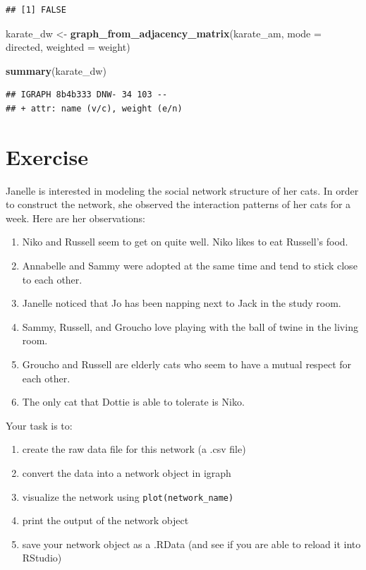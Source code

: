 \documentclass[
]{book}
\newenvironment{Shaded}{\begin{snugshade}}{\end{snugshade}}
\newcommand{\AttributeTok}[1]{\textcolor[rgb]{0.13,0.29,0.53}{#1}}
\newcommand{\FunctionTok}[1]{\textcolor[rgb]{0.13,0.29,0.53}{\textbf{#1}}}
\newcommand{\NormalTok}[1]{#1}
\newcommand{\OtherTok}[1]{\textcolor[rgb]{0.56,0.35,0.01}{#1}}
\newcommand{\StringTok}[1]{\textcolor[rgb]{0.31,0.60,0.02}{#1}}
\providecommand{\tightlist}{%
  \setlength{\itemsep}{0pt}\setlength{\parskip}{0pt}}
\begin{document}
\begin{verbatim}
## [1] FALSE
\end{verbatim}

\begin{Shaded}
\begin{Highlighting}[]
\NormalTok{karate\_dw }\OtherTok{\textless{}{-}} \FunctionTok{graph\_from\_adjacency\_matrix}\NormalTok{(karate\_am, }\AttributeTok{mode =} \StringTok{\textquotesingle{}directed\textquotesingle{}}\NormalTok{, }\AttributeTok{weighted =} \StringTok{\textquotesingle{}weight\textquotesingle{}}\NormalTok{)}

\FunctionTok{summary}\NormalTok{(karate\_dw)}
\end{Highlighting}
\end{Shaded}

\begin{verbatim}
## IGRAPH 8b4b333 DNW- 34 103 -- 
## + attr: name (v/c), weight (e/n)
\end{verbatim}

\section{Exercise}\label{exercise-3}

Janelle is interested in modeling the social network structure of her cats. In order to construct the network, she observed the interaction patterns of her cats for a week. Here are her observations:

\begin{enumerate}
\def\labelenumi{\arabic{enumi}.}
\tightlist
\item
  Niko and Russell seem to get on quite well. Niko likes to eat Russell's food.
\item
  Annabelle and Sammy were adopted at the same time and tend to stick close to each other.
\item
  Janelle noticed that Jo has been napping next to Jack in the study room.
\item
  Sammy, Russell, and Groucho love playing with the ball of twine in the living room.
\item
  Groucho and Russell are elderly cats who seem to have a mutual respect for each other.
\item
  The only cat that Dottie is able to tolerate is Niko.
\end{enumerate}

Your task is to:

\begin{enumerate}
\def\labelenumi{(\roman{enumi})}
\tightlist
\item
  create the raw data file for this network (a .csv file)
\item
  convert the data into a network object in igraph
\item
  visualize the network using \texttt{plot(network\_name)}
\item
  print the output of the network object
\item
  save your network object as a .RData (and see if you are able to reload it into RStudio)
\end{enumerate}
\end{document}

